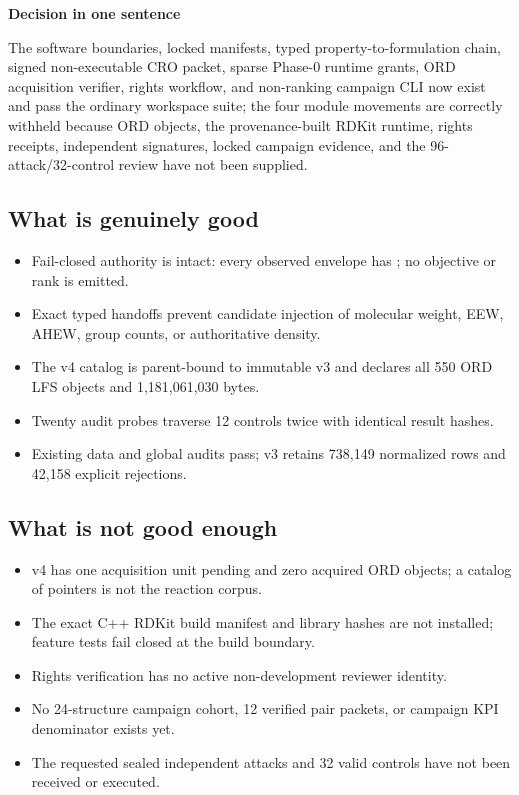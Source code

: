 \documentclass[10pt,a4paper]{article}
\newcommand{\callout}[2]{%
  \begin{tcolorbox}[enhanced,breakable,colback=Panel,colframe=Line,boxrule=.45pt,arc=2mm,left=3mm,right=3mm,top=2.5mm,bottom=2.5mm]
  {\sffamily\bfseries\color{Navy}#1}\par #2
  \end{tcolorbox}}
\newcommand{\code}[1]{{\ttfamily\fontsize{7.2}{8.4}\selectfont\detokenize{#1}}}
\begin{document}
\vspace{2mm}
\callout{Decision in one sentence}{The software boundaries, locked manifests, typed property-to-formulation chain, signed non-executable CRO packet, sparse Phase-0 runtime grants, ORD acquisition verifier, rights workflow, and non-ranking campaign CLI now exist and pass the ordinary workspace suite; the four module movements are correctly withheld because ORD objects, the provenance-built RDKit runtime, rights receipts, independent signatures, locked campaign evidence, and the 96-attack/32-control review have not been supplied.}

\begin{minipage}[t]{.485\linewidth}
\subsection*{What is genuinely good}
\begin{itemize}
  \item Fail-closed authority is intact: every observed envelope has \code{usable_by_optimizer:false}; no objective or rank is emitted.
  \item Exact typed handoffs prevent candidate injection of molecular weight, EEW, AHEW, group counts, or authoritative density.
  \item The v4 catalog is parent-bound to immutable v3 and declares all 550 ORD LFS objects and 1,181,061,030 bytes.
  \item Twenty audit probes traverse 12 controls twice with identical result hashes.
  \item Existing data and global audits pass; v3 retains 738,149 normalized rows and 42,158 explicit rejections.
\end{itemize}
\end{minipage}\hfill
\begin{minipage}[t]{.485\linewidth}
\subsection*{What is not good enough}
\begin{itemize}
  \item v4 has one acquisition unit pending and zero acquired ORD objects; a catalog of pointers is not the reaction corpus.
  \item The exact C++ RDKit build manifest and library hashes are not installed; feature tests fail closed at the build boundary.
  \item Rights verification has no active non-development reviewer identity.
  \item No 24-structure campaign cohort, 12 verified pair packets, or campaign KPI denominator exists yet.
  \item The requested sealed independent attacks and 32 valid controls have not been received or executed.
\end{itemize}
\end{minipage}
\end{document}
